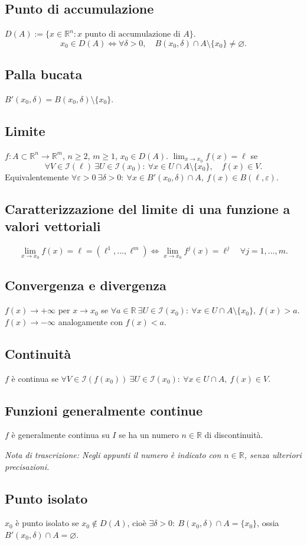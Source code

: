\documentclass[11pt,a4paper]{article}
\newcommand{\R}{\mathbb R}\newcommand{\N}{\mathbb N}\newcommand{\pagina}[1]{\clearpage}
\newcommand{\nota}[1]{\par\textit{Nota di trascrizione: #1}\par}
\begin{document}
\subsection*{Punto di accumulazione}
$D(A):=\{x\in\R^n:x\text{ punto di accumulazione di }A\}$.
\[x_0\in D(A)\iff\forall\delta>0,\quad B(x_0,\delta)\cap A\setminus\{x_0\}\ne\varnothing.\]
\subsection*{Palla bucata}
$B'(x_0,\delta)=B(x_0,\delta)\setminus\{x_0\}$.
\subsection*{Limite}
$f:A\subset\R^n\to\R^m$, $n\ge2$, $m\ge1$, $x_0\in D(A)$. $\lim_{x\to x_0}f(x)=\ell$ se
\[\forall V\in\mathcal I(\ell)\ \exists U\in\mathcal I(x_0):\ \forall x\in U\cap A\setminus\{x_0\},\quad f(x)\in V.\]
Equivalentemente $\forall\varepsilon>0\ \exists\delta>0:\ \forall x\in B'(x_0,\delta)\cap A,\ f(x)\in B(\ell,\varepsilon)$.
\subsection*{Caratterizzazione del limite di una funzione a valori vettoriali}
\[\lim_{x\to x_0}f(x)=\ell=(\ell^1,\ldots,\ell^m)\iff\lim_{x\to x_0}f^j(x)=\ell^j\quad\forall j=1,\ldots,m.\]
\subsection*{Convergenza e divergenza}
$f(x)\to+\infty$ per $x\to x_0$ se $\forall a\in\R\ \exists U\in\mathcal I(x_0):\ \forall x\in U\cap A\setminus\{x_0\},\ f(x)>a$.
$f(x)\to-\infty$ analogamente con $f(x)<a$.
\pagina{12}
\subsection*{Continuità}
$f$ è continua se $\forall V\in\mathcal I(f(x_0))\ \exists U\in\mathcal I(x_0):\ \forall x\in U\cap A,\ f(x)\in V$.
\subsection*{Funzioni generalmente continue}
$f$ è generalmente continua su $I$ se ha un numero $n\in\R$ di discontinuità.
\nota{Negli appunti il numero è indicato con $n\in\R$, senza ulteriori precisazioni.}
\subsection*{Punto isolato}
$x_0$ è punto isolato se $x_0\notin D(A)$, cioè $\exists\delta>0:\ B(x_0,\delta)\cap A=\{x_0\}$, ossia $B'(x_0,\delta)\cap A=\varnothing$.
\end{document}
